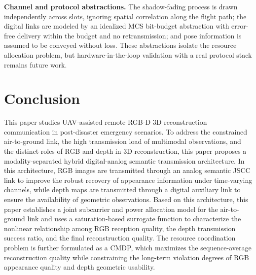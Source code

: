 \documentclass[journal]{IEEEtran}
\begin{document}
\textbf{Channel and protocol abstractions.} The shadow-fading process is drawn independently across slots, ignoring spatial correlation along the flight path; the digital links are modeled by an idealized MCS bit-budget abstraction with error-free delivery within the budget and no retransmission; and pose information is assumed to be conveyed without loss. These abstractions isolate the resource allocation problem, but hardware-in-the-loop validation with a real protocol stack remains future work.

\section{Conclusion}
\label{sec:conclusion}

This paper studies UAV-assisted remote RGB-D 3D reconstruction communication in post-disaster emergency scenarios. To address the constrained air-to-ground link, the high transmission load of multimodal observations, and the distinct roles of RGB and depth in 3D reconstruction, this paper proposes a modality-separated hybrid digital-analog semantic transmission architecture. In this architecture, RGB images are transmitted through an analog semantic JSCC link to improve the robust recovery of appearance information under time-varying channels, while depth maps are transmitted through a digital auxiliary link to ensure the availability of geometric observations. Based on this architecture, this paper establishes a joint subcarrier and power allocation model for the air-to-ground link and uses a saturation-based surrogate function to characterize the nonlinear relationship among RGB reception quality, the depth transmission success ratio, and the final reconstruction quality. The resource coordination problem is further formulated as a CMDP, which maximizes the sequence-average reconstruction quality while constraining the long-term violation degrees of RGB appearance quality and depth geometric usability.
\end{document}
